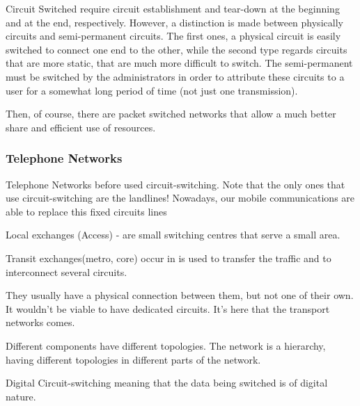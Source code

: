 Circuit Switched require circuit establishment and tear-down at the beginning and at the end, respectively. However, a distinction is made between physically  circuits and semi-permanent circuits. The first ones, a physical circuit is easily switched to connect one end to the other, while the second type regards circuits that are more static, that are much more difficult to switch. The semi-permanent must be switched by the administrators in order to attribute these circuits to a user for a somewhat long period of time (not just one transmission).



Then, of course, there are packet switched networks that allow a much better share and efficient use of resources.




\subsubsection*{Telephone Networks}
Telephone Networks before used circuit-switching. Note that the only ones that use circuit-switching are the landlines! Nowadays, our mobile communications are able to replace this fixed circuits lines

Local exchanges (Access) - are small switching centres that serve a small area.

Transit exchanges(metro, core) occur in  is used to transfer the traffic and to interconnect several circuits.

They usually have a physical connection between them, but not one of their own. It wouldn't be viable to have dedicated circuits. It's here that the transport networks comes.

Different components have different topologies. The network is a hierarchy, having different topologies in different parts of the network.

Digital Circuit-switching meaning that the data being switched is of digital nature.



